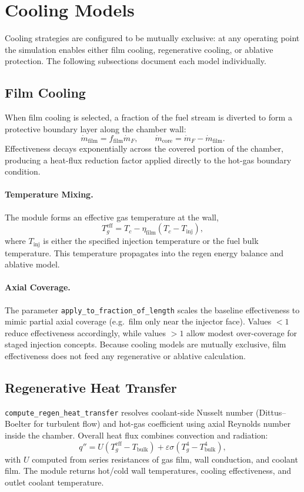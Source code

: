 \documentclass[12pt]{article}
\begin{document}
\section{Cooling Models}
\label{sec:cooling}

Cooling strategies are configured to be mutually exclusive: at any operating point the simulation enables either film cooling, regenerative cooling, or ablative protection.  The following subsections document each model individually.

\subsection{Film Cooling}
When film cooling is selected, a fraction of the fuel stream is diverted to form a protective boundary layer along the chamber wall:
\[
\dot{m}_{\text{film}} = f_{\text{film}} \dot{m}_F,
\qquad
\dot{m}_{\text{core}} = \dot{m}_F - \dot{m}_{\text{film}}.
\]
Effectiveness decays exponentially across the covered portion of the chamber, producing a heat-flux reduction factor applied directly to the hot-gas boundary condition.

\paragraph{Temperature Mixing.}  The module forms an effective gas temperature at the wall,
\[
T_g^{\text{eff}} = T_c - \eta_{\text{film}} (T_c - T_{\text{inj}}),
\]
where $T_{\text{inj}}$ is either the specified injection temperature or the fuel bulk temperature.  This temperature propagates into the regen energy balance and ablative model.

\paragraph{Axial Coverage.}  The parameter \verb|apply_to_fraction_of_length| scales the baseline effectiveness to mimic partial axial coverage (e.g.\ film only near the injector face).  Values $<1$ reduce effectiveness accordingly, while values $>1$ allow modest over-coverage for staged injection concepts.  Because cooling models are mutually exclusive, film effectiveness does not feed any regenerative or ablative calculation.

\subsection{Regenerative Heat Transfer}
\verb|compute_regen_heat_transfer| resolves coolant-side Nusselt number (Dittus--Boelter for turbulent flow) and hot-gas coefficient using axial Reynolds number inside the chamber.  Overall heat flux combines convection and radiation:
\[
q'' = U (T_g^{\text{eff}} - T_{\text{bulk}}) + \varepsilon \sigma (T_g^{4} - T_{\text{bulk}}^{4}),
\]
with $U$ computed from series resistances of gas film, wall conduction, and coolant film.  The module returns hot/cold wall temperatures, cooling effectiveness, and outlet coolant temperature.
\end{document}
